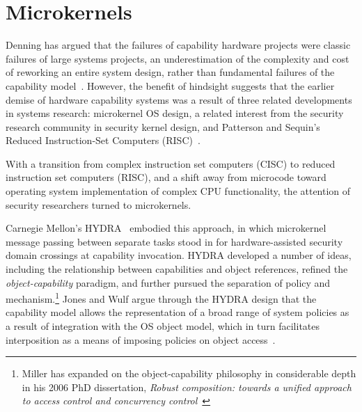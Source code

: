 

\section{Microkernels} %

Denning has argued that the failures of capability hardware projects were classic failures of
large systems projects, an underestimation of the complexity and cost of reworking an entire system
design, rather than fundamental failures of the capability model~\cite{denning:faulttolerance}.
However, the benefit of hindsight suggests that the earlier demise of hardware capability systems
was a result of three related developments in systems research: microkernel OS design, a
related interest from the security research community in security kernel design, and
Patterson and Sequin's Reduced Instruction-Set Computers (RISC)~\cite{patterson:risc}.

With a transition from complex instruction set computers (CISC) to reduced instruction
set computers (RISC), and a shift away from microcode toward operating system implementation
of complex CPU functionality, the attention of security researchers turned to microkernels.

Carnegie Mellon's HYDRA~\cite{CohenJefferson75,Wulf81} embodied this approach, in which microkernel
message passing between separate tasks stood in for hardware-assisted security domain crossings
at capability invocation.
HYDRA developed a number of ideas, including the relationship between
capabilities and object references, refined the {\em object-capability} paradigm,
and
further pursued the separation of policy and mechanism.\footnote{Miller has expanded on the
object-capability philosophy in considerable depth in his 2006 PhD dissertation,
{\em Robust composition: towards a unified approach to access control and concurrency
control}~\cite{miller:robustcomposition}}
Jones and Wulf argue through the HYDRA design that the capability model allows the
representation of a broad range of
system policies as a result of integration with the OS object model, which in turn facilitates
interposition as a means of imposing policies on object access~\cite{Jones74}.

